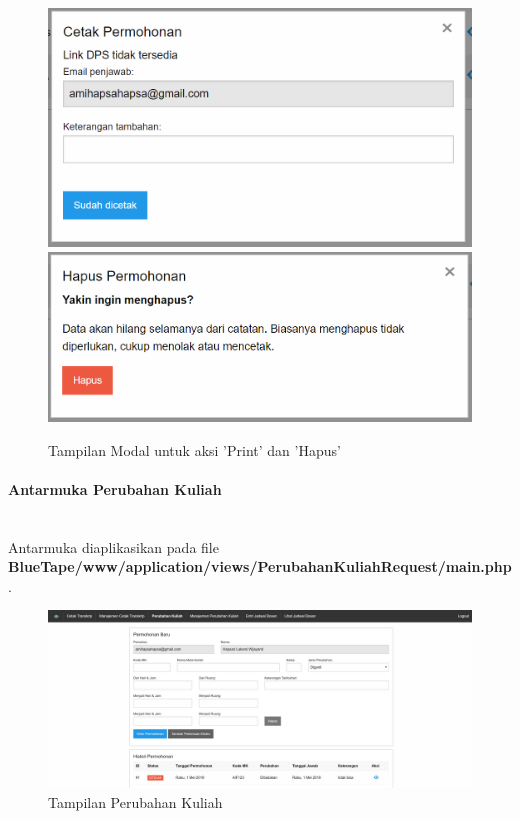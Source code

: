 \documentclass[a4paper,twoside]{article}
\newcommand{\myparagraph}[1]{\paragraph{#1}\mbox{}\\}
\begin{document}
\begin{enumerate}
		\begin{figure} [H]
			\centering  
			\includegraphics[scale=0.5]{Modal-Print-Manajemen-Cetak-Transkrip.png}  
			\includegraphics[scale=0.5]{Modal-Hapus-Manajemen-Cetak-Transkrip.png} 
			\caption{Tampilan Modal untuk aksi 'Print' dan 'Hapus'} 	
		\end{figure}
		
		
		\myparagraph{Antarmuka Perubahan Kuliah}
		Antarmuka diaplikasikan pada file \textbf{BlueTape/www/application/views/PerubahanKuliahRequest/main.php}.
		\begin{figure} [H]
			\centering  
			\includegraphics[scale=0.5]{Tampilan-Perubahan-Kuliah.png}  
			\caption{Tampilan Perubahan Kuliah} 
		\end{figure}
		

\end{enumerate}
\end{document}
